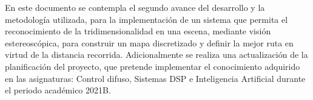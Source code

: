 En este documento se contempla el segundo avance del desarrollo y la metodología utilizada, para la implementación de un sistema que permita el reconocimiento de la tridimensionalidad en una escena, mediante visión estereoscópica, para construir un mapa discretizado y definir la mejor ruta en virtud de la distancia recorrida. Adicionalmente se realiza una actualización de la planificación del proyecto, que pretende implementar el conocimiento adquirido en las asignaturas: Control difuso, Sistemas DSP e Inteligencia Artificial durante el periodo académico 2021B.